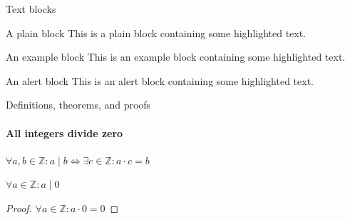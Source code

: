 \documentclass{beamer}
\begin{document}
\begin{darkframes}
\begin{frame}[label=simmonshall]{Text blocks}
    \begin{block}{A plain block}
      This is a plain block containing some \alert{highlighted text}.
    \end{block}
    \begin{exampleblock}{An example block}
      This is an example block containing some \alert{highlighted text}.
    \end{exampleblock}
    \begin{alertblock}{An alert block}
      This is an alert block containing some \alert{highlighted text}.
    \end{alertblock}
  \end{frame}

  \begin{frame}[label=proof]{Definitions, theorems, and proofs}
    \framesubtitle{All integers divide zero}
    \begin{definition}
      $\forall a,b\in\mathds{Z}: a\mid b\iff\exists c\in\mathds{Z}:a\cdot c=b$
    \end{definition}
    \begin{theorem}
      $\forall a\in\mathds{Z}: a\mid 0$
    \end{theorem}
    \begin{proof}[Proof\nopunct]
      $\forall a\in\mathds{Z}: a\cdot 0=0$
    \end{proof}
  \end{frame}


\end{darkframes}
\end{document}
